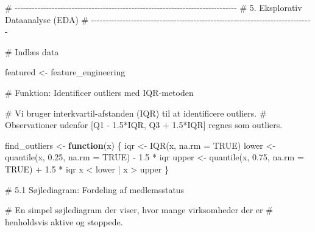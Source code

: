 \documentclass[
  11pt,
  letterpaper,
  DIV=11,
  numbers=noendperiod]{scrartcl}
\newenvironment{Shaded}{\begin{snugshade}}{\end{snugshade}}
\newcommand{\AttributeTok}[1]{\textcolor[rgb]{0.40,0.45,0.13}{#1}}
\newcommand{\CommentTok}[1]{\textcolor[rgb]{0.37,0.37,0.37}{#1}}
\newcommand{\ConstantTok}[1]{\textcolor[rgb]{0.56,0.35,0.01}{#1}}
\newcommand{\ControlFlowTok}[1]{\textcolor[rgb]{0.00,0.23,0.31}{\textbf{#1}}}
\newcommand{\FloatTok}[1]{\textcolor[rgb]{0.68,0.00,0.00}{#1}}
\newcommand{\FunctionTok}[1]{\textcolor[rgb]{0.28,0.35,0.67}{#1}}
\newcommand{\NormalTok}[1]{\textcolor[rgb]{0.00,0.23,0.31}{#1}}
\newcommand{\OtherTok}[1]{\textcolor[rgb]{0.00,0.23,0.31}{#1}}
\newcommand{\SpecialCharTok}[1]{\textcolor[rgb]{0.37,0.37,0.37}{#1}}
\begin{document}
\begin{Shaded}
\begin{Highlighting}[]
\CommentTok{\# {-}{-}{-}{-}{-}{-}{-}{-}{-}{-}{-}{-}{-}{-}{-}{-}{-}{-}{-}{-}{-}{-}{-}{-}{-}{-}{-}{-}{-}{-}{-}{-}{-}{-}{-}{-}{-}{-}{-}{-}{-}{-}{-}{-}{-}{-}{-}{-}{-}{-}{-}{-}{-}{-}{-}{-}{-}{-}{-}{-}{-}{-}{-}{-}{-}{-}{-}{-}{-}{-}{-}{-}{-}{-}{-}{-}{-}{-}}
\CommentTok{\# 5. Eksplorativ Dataanalyse (EDA)}
\CommentTok{\# {-}{-}{-}{-}{-}{-}{-}{-}{-}{-}{-}{-}{-}{-}{-}{-}{-}{-}{-}{-}{-}{-}{-}{-}{-}{-}{-}{-}{-}{-}{-}{-}{-}{-}{-}{-}{-}{-}{-}{-}{-}{-}{-}{-}{-}{-}{-}{-}{-}{-}{-}{-}{-}{-}{-}{-}{-}{-}{-}{-}{-}{-}{-}{-}{-}{-}{-}{-}{-}{-}{-}{-}{-}{-}{-}{-}{-}{-}}

\CommentTok{\# Indlæs data}

\NormalTok{featured }\OtherTok{\textless{}{-}}\NormalTok{ feature\_engineering}

\CommentTok{\# Funktion: Identificer outliers med IQR{-}metoden}

\CommentTok{\# Vi bruger interkvartil{-}afstanden (IQR) til at identificere outliers.}
\CommentTok{\# Observationer udenfor [Q1 {-} 1.5*IQR, Q3 + 1.5*IQR] regnes som outliers.}

\NormalTok{find\_outliers }\OtherTok{\textless{}{-}} \ControlFlowTok{function}\NormalTok{(x) \{}
\NormalTok{  iqr }\OtherTok{\textless{}{-}} \FunctionTok{IQR}\NormalTok{(x, }\AttributeTok{na.rm =} \ConstantTok{TRUE}\NormalTok{)}
\NormalTok{  lower }\OtherTok{\textless{}{-}} \FunctionTok{quantile}\NormalTok{(x, }\FloatTok{0.25}\NormalTok{, }\AttributeTok{na.rm =} \ConstantTok{TRUE}\NormalTok{) }\SpecialCharTok{{-}} \FloatTok{1.5} \SpecialCharTok{*}\NormalTok{ iqr}
\NormalTok{  upper }\OtherTok{\textless{}{-}} \FunctionTok{quantile}\NormalTok{(x, }\FloatTok{0.75}\NormalTok{, }\AttributeTok{na.rm =} \ConstantTok{TRUE}\NormalTok{) }\SpecialCharTok{+} \FloatTok{1.5} \SpecialCharTok{*}\NormalTok{ iqr}
\NormalTok{  x }\SpecialCharTok{\textless{}}\NormalTok{ lower }\SpecialCharTok{|}\NormalTok{ x }\SpecialCharTok{\textgreater{}}\NormalTok{ upper}
\NormalTok{\}}


\CommentTok{\# 5.1 Søjlediagram: Fordeling af medlemsstatus}

\CommentTok{\# En simpel søjlediagram der viser, hvor mange virksomheder der er}
\CommentTok{\# henholdsvis aktive og stoppede.}


\end{Highlighting}
\end{Shaded}
\end{document}
